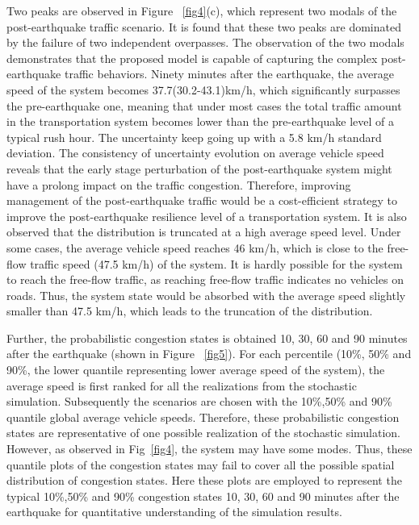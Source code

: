 \documentclass[review,11pt,nonatbib]{elsarticle}
\begin{document}
Two peaks are observed in Figure ~\ref{fig4}(c), which represent two modals of the post-earthquake traffic scenario. It is found that these two peaks are dominated by the failure of two independent overpasses. The observation of the two modals demonstrates that the proposed model is capable of capturing the complex post-earthquake traffic behaviors. Ninety minutes after the earthquake, the average speed of the system becomes 37.7(30.2-43.1)km/h, which significantly surpasses the pre-earthquake one, meaning that under most cases the total traffic amount in the transportation system becomes lower than the pre-earthquake level of a typical rush hour. The uncertainty keep going up with a 5.8 km/h standard deviation. The consistency of uncertainty evolution on average vehicle speed reveals that the early stage perturbation of the post-earthquake system might have a prolong impact on the traffic congestion. Therefore, improving management of the post-earthquake traffic would be a cost-efficient strategy to improve the post-earthquake resilience level of a transportation system. It is also observed that the distribution is truncated at a high average speed level. Under some cases, the average vehicle speed reaches 46 km/h, which is close to the free-flow traffic speed (47.5 km/h) of the system. It is hardly possible for the system to reach the free-flow traffic, as reaching free-flow traffic indicates no vehicles on roads. Thus, the system state would be absorbed with the average speed slightly smaller than 47.5 km/h, which leads to the truncation of the distribution.

\par Further, the probabilistic congestion states is obtained 10, 30, 60 and 90 minutes after the earthquake (shown in Figure ~\ref{fig5}). For each percentile (10\%, 50\% and 90\%, the lower quantile representing lower average speed of the system), the average speed is first ranked for all the realizations from the stochastic simulation. Subsequently the scenarios are chosen with the 10\%,50\% and 90\% quantile global average vehicle speeds. Therefore, these probabilistic congestion states are representative of one possible realization of the stochastic simulation. However, as observed in Fig~\ref{fig4}, the system may have some modes. Thus, these quantile plots of the congestion states may fail to cover all the possible spatial distribution of congestion states. Here these plots are employed to represent the typical 10\%,50\% and 90\% congestion states 10, 30, 60 and 90 minutes after the earthquake for quantitative understanding of the simulation results. 
\end{document}
